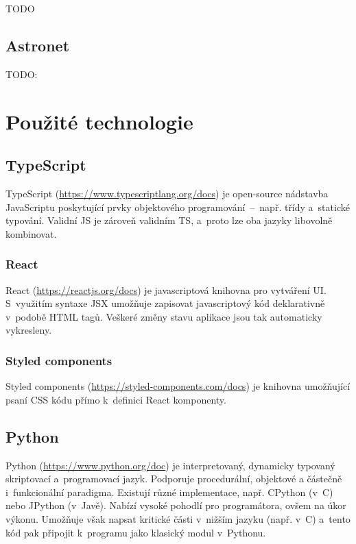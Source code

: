 \documentclass[a4paper,12pt]{article}
\begin{document}
{{{{{{{{TODO

\subsection{Astronet}

TODO: \cite{kepler80}

\section{Použité technologie}

\subsection{TypeScript}

TypeScript (\url{https://www.typescriptlang.org/docs}) je open-source nádstavba JavaScriptu poskytující prvky objektového programování~--~např. třídy a~statické typování. Validní JS je zároveň validním TS, a~proto lze oba jazyky libovolně kombinovat.

\subsubsection{React}

React (\url{https://reactjs.org/docs}) je javascriptová knihovna pro vytváření UI. S~využitím syntaxe JSX umožňuje zapisovat javascriptový kód deklarativně v~podobě HTML tagů. Veškeré změny stavu aplikace jsou tak automaticky vykresleny.



\subsubsection{Styled components}

Styled components (\url{https://styled-components.com/docs}) je knihovna umožňující psaní CSS kódu přímo k~definici React komponenty.



\subsection{Python}

Python (\url{https://www.python.org/doc}) je interpretovaný, dynamicky typovaný skriptovací a~programovací jazyk. Podporuje procedurální, objektové a částečně i~funkcionální paradigma. Existují různé implementace, např. CPython (v~C) nebo JPython (v~Javě). Nabízí vysoké pohodlí pro programátora, ovšem na úkor výkonu. Umožňuje však napsat kritické části v~nižším jazyku (např. v~C) a~tento kód pak připojit k~programu jako klasický modul v~Pythonu.

}}}}}}}}
\end{document}
